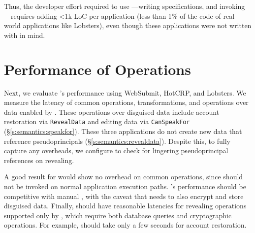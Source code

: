 Thus, the developer effort required to use \sys---writing \sys specifications,
and invoking \sys---requires adding <1k LoC per application (less than 1\% of
the code of real world applications like Lobsters), even though these
applications were not written with \sys in mind.

\section{Performance of \sys Operations}
\label{s:eval-ops}

%
Next, we evaluate \sys's performance using WebSubmit,
HotCRP, and Lobsters.
%
%
We measure the latency of common operations, \xxing transformations, and
operations over \xxed data enabled by \sys. These operations over disguised data
include account restoration via \texttt{RevealData} and editing \xxed data via
\texttt{CanSpeakFor} (\S\ref{s:semantics:speakfor}).
%
These three applications do not create new data that reference pseudoprincipals
(\S\ref{s:semantics:revealdata}). Despite this, to fully capture any overheads, we
configure \sys to check for lingering pseudoprincipal
references on revealing.
%

%
A good result for \sys would show no overhead on common operations, since \sys
should not be invoked on normal application execution paths.
%
\sys's performance should be competitive with manual \xxing, with the caveat that \sys needs
to also encrypt and store disguised data.
%
Finally, \sys should have reasonable latencies for revealing operations
supported only by \sys, which require both database queries and cryptographic
operations. For example, \sys should take only a few seconds for account
restoration.
%

